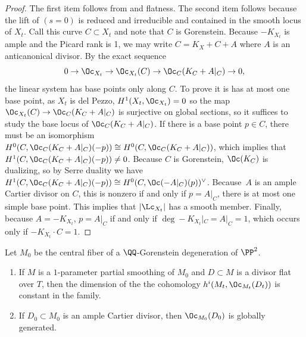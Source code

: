 \begin{proof}
The first item follows from \cite[Prop.\,2.79]{KollarModuliBook} and flatness. The second item follows because the lift of $(s = 0)$ is reduced and irreducible and contained in the smooth locus of $X_t$. Call this curve $C \subset X_t$ and note that $C$ is Gorenstein. Because $-K_{X_t}$ is ample and the Picard rank is 1, we may write $C = K_X + C + A$ where $A$ is an anticanonical divisor. By the exact sequence
\[ 0 \to \Oc_{X_t} \to \Oc_{X_t}(C) \to \Oc_C(K_C+A|_C) \to 0,\]
the linear system has base points only along $C$. To prove it is has at most one base point, as $X_t$ is del Pezzo, $H^1(X_t, \Oc_{X_t}) = 0$ so the map $\Oc_{X_t}(C) \to \Oc_C(K_C+A|_C)$ is surjective on global sections, so it suffices to study the base locus of $\Oc_C(K_C+A|_C)$. If there is a base point $p \in C$, there must be an isomorphism $H^0(C,\Oc_C(K_C+A|_C)(-p)) \cong H^0(C,\Oc_C(K_C+A|_C))$, which implies that $H^1(C,\Oc_C(K_C+A|_C)(-p)) \ne 0$. Because $C$ is Gorenstein, $\Oc(K_C)$ is dualizing, so by Serre duality we have $H^1(C,\Oc_C(K_C+A|_C)(-p)) \cong H^0(C, \Oc(-A|_C)(p))^\vee$. Because~$A$ is an ample Cartier divisor on $C$, this is nonzero if and only if $p = A|_C$, \ie there is at most one simple base point. This implies that $|\Lc_{X_t}|$ has a smooth member. Finally, because $A = -K_{X_t}$, $p = A|_C $ if and only if $\deg -K_{X_t}|_C = A|_C = 1$, which occurs only if $-K_{X_t} \cdot C = 1$.
\end{proof}

\begin{corollary}\label{cor:ampleisbpfformanetti} Let $M_0$ be the central fiber of a $\QQ$-Gorenstein degeneration of $\PP^2$.
\begin{enumerate}
\item\label{cor:ampleisbpfformanetti1} If $M$ is a $1$-parameter partial smoothing of $M_0$ and $D\subset M$ is a divisor flat over $T$, then the dimension of the the cohomology $h^i(M_t,\Oc_{M_t}(D_t))$ is constant in the family.
\item\label{cor:ampleisbpfformanetti2} If $D_0\subset M_0$ is an ample Cartier divisor, then $\Oc_{M_0}(D_0)$ is globally generated.
\end{enumerate}
\end{corollary}\label{globallygenerated}

